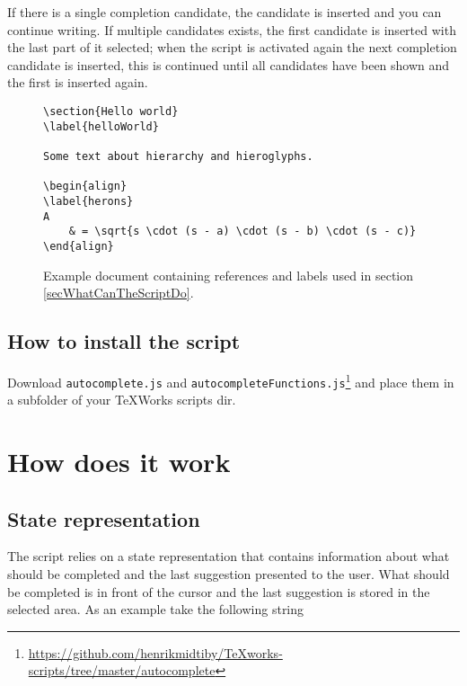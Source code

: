 \documentclass{article}
\begin{document}
If there is a single completion candidate, the candidate is inserted 
and you can continue writing.
If multiple candidates exists, the first candidate is inserted with 
the last part of it selected; when the script is activated again the 
next completion candidate is inserted, this is continued until all 
candidates have been shown and the first is inserted again.



\begin{figure}[t]
\centering
\begin{verbatim}
\section{Hello world}
\label{helloWorld}

Some text about hierarchy and hieroglyphs.

\begin{align}
\label{herons}
A
	& = \sqrt{s \cdot (s - a) \cdot (s - b) \cdot (s - c)}
\end{align}
\end{verbatim}
\caption{Example document containing references and labels used in section \ref{secWhatCanTheScriptDo}.}
\label{figExampleDocument}
\end{figure}


\subsection{How to install the script}

Download \texttt{autocomplete.js} and 
\texttt{autocompleteFunctions.js}\footnote{\url{https://github.com/henrikmidtiby/TeXworks-scripts/tree/master/autocomplete}} and place them in a subfolder of your 
TeXWorks scripts dir.




\section{How does it work}

\subsection{State representation}

The script relies on a state representation that contains information 
about what should be completed and the last suggestion presented to 
the user.
What should be completed is in front of the cursor and the last 
suggestion is stored in the selected area.
As an example take the following string
\end{document}
